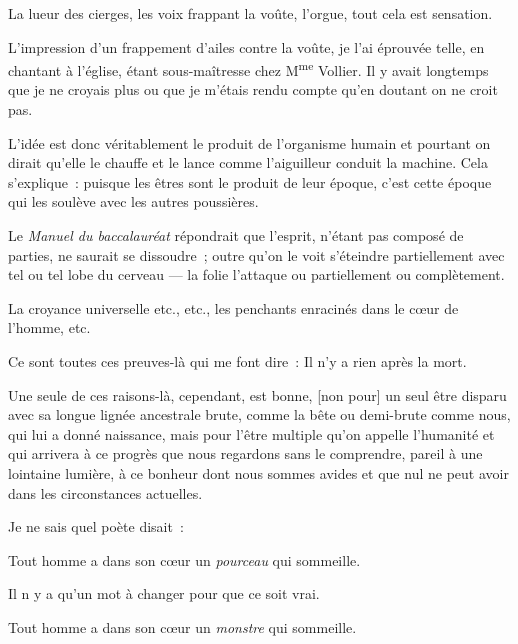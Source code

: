 \documentclass[french,twoside]{book} %
\newcommand\corr[1]{#1}
\newenvironment{quoteblock}%
  {\begin{quoting}}
  {\end{quoting}}
\newenvironment{quotebar}{%
    \def\FrameCommand{{\color{rubric!10!}\vrule width 0.5em} \hspace{0.9em}}%
    \def\OuterFrameSep{\itemsep} %
    \MakeFramed {\advance\hsize-\width \FrameRestore}
  }%
  {%
    \endMakeFramed
  }
\renewenvironment{quoteblock}%
  {%
    \savenotes
    \setstretch{0.9}
    \normalfont
    \begin{quotebar}
  }
  {%
    \end{quotebar}
    \spewnotes
  }
\begin{document}
La lueur des cierges, les voix frappant la voûte, l’orgue, tout cela est sensation.\par
L’impression d’un frappement d’ailes contre  la voûte, je l’ai éprouvée telle, en chantant à l’église, étant sous-maîtresse chez M\textsuperscript{me} Vollier. Il y avait longtemps que je ne croyais plus ou que je m’étais rendu compte qu’en doutant on ne croit pas.\par
L’idée est donc véritablement le produit de l’organisme humain et pourtant on dirait qu’elle le chauffe et le lance comme l’aiguilleur conduit la machine. Cela s’explique : puisque les êtres sont le produit de leur époque, c’est cette époque qui les soulève avec les autres poussières.\par
Le \emph{Manuel du baccalauréat} répondrait que l’esprit, n’étant pas composé de parties, ne saurait se dissoudre ; outre qu’on le voit s’éteindre partiellement avec tel ou tel lobe du cerveau — la folie l’attaque ou partiellement ou complètement.\par
La croyance universelle etc., etc., les penchants enracinés dans le cœur de l’homme, etc.\par
Ce sont toutes ces preuves-là qui me font dire : Il n’y a rien après la mort.\par
Une seule de ces raisons-là, cependant, est bonne, [{\corr non pour}] un seul être disparu avec sa longue lignée ancestrale brute, comme la bête ou demi-brute comme nous, qui lui a donné naissance, mais pour l’être multiple qu’on appelle l’humanité et qui arrivera à ce progrès que nous regardons sans le comprendre, pareil à une lointaine  lumière, à ce bonheur dont nous sommes avides et que nul ne peut avoir dans les circonstances actuelles.\par
Je ne sais quel poète disait :\par

\begin{quoteblock}
 \noindent Tout homme a dans son cœur un \emph{pourceau} qui sommeille.
 \end{quoteblock}

\noindent Il n y a qu’un mot à changer pour que ce soit vrai.\par

\begin{quoteblock}
 \noindent Tout homme a dans son cœur un \emph{monstre} qui sommeille.
 \end{quoteblock}
\end{document}
